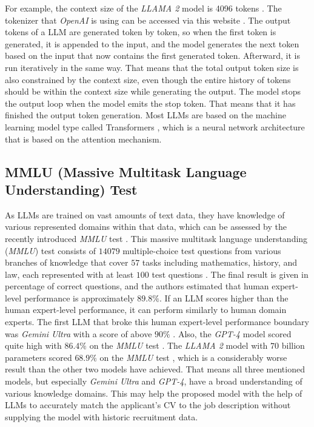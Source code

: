 \documentclass[draft,final]{thesisclass} %
\begin{document}
For example, the context size of the \textit{LLAMA 2} model is 4096 tokens \parencite[47]{llama2}.
The tokenizer that \textit{OpenAI} is using can be accessed via this website \textcite{openai_tokenizer}.
The output tokens of a \gls{LLM} are generated token by token, so when the first token is generated, it is appended to the input, and the model generates the next token based on the input that now contains the first generated token. Afterward, it is run iteratively in the same way.
That means that the total output token size is also constrained by the context size, even though the entire history of tokens should be within the context size while generating the output.
The model stops the output loop when the model emits the stop token. That means that it has finished the output token generation.
Most \gls{LLM}s are based on the machine learning model type called Transformers \parencite[1]{transformer}, which is a neural network architecture that is based on the attention mechanism.

\subsection{MMLU (Massive Multitask Language Understanding) Test}
As \gls{LLM}s are trained on vast amounts of text data, they have knowledge of various represented domains within that data, which can be assessed by the recently introduced \textit{MMLU} test \parencite{mmlu}.
This massive multitask language understanding (\textit{MMLU}) test consists of $14079$ multiple-choice test questions from various branches of knowledge that cover $57$ tasks including mathematics, history, and law, each represented with at least $100$ test questions \parencite[1-3]{mmlu}.
The final result is given in percentage of correct questions, and the authors estimated that human expert-level performance is approximately $89.8\%$.
If an \gls{LLM} scores higher than the human expert-level performance, it can perform similarly to human domain experts.
The first \gls{LLM} that broke this human expert-level performance boundary was \textit{Gemini Ultra} with a score of above $90\%$ \parencite[1]{gemini}.
Also, the \textit{GPT-4} model scored quite high with $86.4\%$ on the \textit{MMLU} test \parencite[32]{gpt4}.
The \textit{LLAMA 2} model with $70$ billion parameters scored $68.9\%$ on the \textit{MMLU} test \parencite[49]{llama2}, which is a considerably worse result than the other two models have achieved.
That means all three mentioned models, but especially \textit{Gemini Ultra} and \textit{GPT-4}, have a broad understanding of various knowledge domains.
This may help the proposed model with the help of \gls{LLM}s to accurately match the applicant's \acs{CV} to the job description without supplying the model with historic recruitment data.
\end{document}

